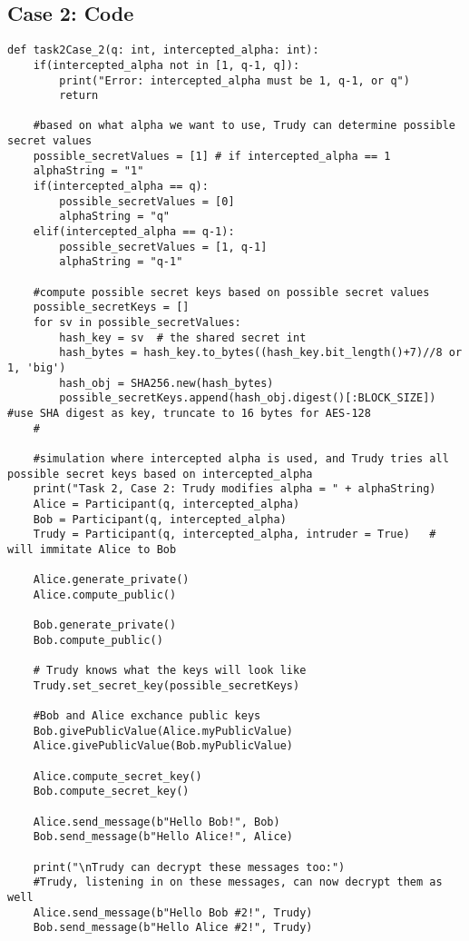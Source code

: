 \documentclass[11pt]{article}
\begin{document}
\subsection*{Case 2: Code}
\begin{lstlisting}
def task2Case_2(q: int, intercepted_alpha: int):
    if(intercepted_alpha not in [1, q-1, q]):
        print("Error: intercepted_alpha must be 1, q-1, or q")
        return
    
    #based on what alpha we want to use, Trudy can determine possible secret values
    possible_secretValues = [1] # if intercepted_alpha == 1
    alphaString = "1"
    if(intercepted_alpha == q):
        possible_secretValues = [0]
        alphaString = "q"
    elif(intercepted_alpha == q-1):
        possible_secretValues = [1, q-1]
        alphaString = "q-1"

    #compute possible secret keys based on possible secret values
    possible_secretKeys = []
    for sv in possible_secretValues:
        hash_key = sv  # the shared secret int
        hash_bytes = hash_key.to_bytes((hash_key.bit_length()+7)//8 or 1, 'big')
        hash_obj = SHA256.new(hash_bytes)
        possible_secretKeys.append(hash_obj.digest()[:BLOCK_SIZE])  #use SHA digest as key, truncate to 16 bytes for AES-128
    #

    #simulation where intercepted alpha is used, and Trudy tries all possible secret keys based on intercepted_alpha
    print("Task 2, Case 2: Trudy modifies alpha = " + alphaString)
    Alice = Participant(q, intercepted_alpha)
    Bob = Participant(q, intercepted_alpha)
    Trudy = Participant(q, intercepted_alpha, intruder = True)   # will immitate Alice to Bob

    Alice.generate_private()
    Alice.compute_public()

    Bob.generate_private()
    Bob.compute_public()

    # Trudy knows what the keys will look like
    Trudy.set_secret_key(possible_secretKeys)

    #Bob and Alice exchance public keys
    Bob.givePublicValue(Alice.myPublicValue)
    Alice.givePublicValue(Bob.myPublicValue)

    Alice.compute_secret_key()
    Bob.compute_secret_key()

    Alice.send_message(b"Hello Bob!", Bob)
    Bob.send_message(b"Hello Alice!", Alice)

    print("\nTrudy can decrypt these messages too:")
    #Trudy, listening in on these messages, can now decrypt them as well
    Alice.send_message(b"Hello Bob #2!", Trudy)
    Bob.send_message(b"Hello Alice #2!", Trudy)
\end{lstlisting}
\end{document}
